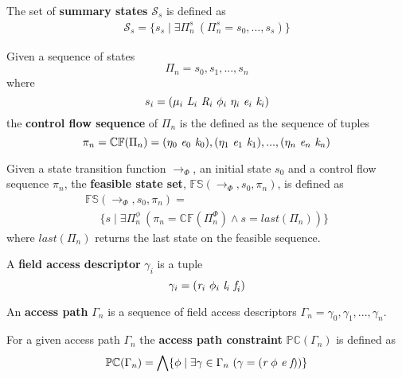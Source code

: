 \begin{definition}
The set of \textbf{summary states} $\mathcal{S}_s$ is defined as
\begin{align}
\mathcal{S}_s = \{s_s \mid \exists \Pi_n^s\ (\Pi_n^s = s_0, \ldots, s_s)\}
\end{align}
\end{definition}

\begin{definition}
Given a sequence of states $$\Pi_n = s_0,s_1,...,s_n$$ where $$s_i = ( \mu_i\ \cfgnt{L}_i\ \cfgnt{R}_i\ \phi_i\ \eta_i\ \cfgnt{e}_i\ \cfgnt{k}_i )$$ the \textbf{control flow sequence} of $\Pi_n$ is the defined as the sequence of tuples $$ \pi_n = \mathbb{CF}(\Pi_n) = (\eta_0\ \cfgnt{e}_0\ \cfgnt{k}_0),(\eta_1\ \cfgnt{e}_1\ \cfgnt{k}_1),...,(\eta_n\ \cfgnt{e}_n\ \cfgnt{k}_n)$$
\end{definition}

\begin{definition}
Given a state transition function $\rightarrow_{\Phi}$, an initial state $s_0$ and a control flow sequence $\pi_n$, the \textbf{feasible state set}, $\mathbb{FS}(\rightarrow_{\Phi},s_0,\pi_n)$, is defined as
 $$
\begin{array}{l}
\mathbb{FS}(\rightarrow_{\Phi},s_0,\pi_n) = \\
\ \ \ \ \ \ \{s \mid \exists \Pi_n^\phi\ (\pi_n = \mathbb{CF}(\Pi_n^\Phi) \wedge s = \mathit{last}(\Pi_n))\} 
\end{array}
$$
where $\mathit{last}(\Pi_n)$ returns the last state on the feasible sequence.
\end{definition}

\begin{definition}
A \textbf{field access descriptor} $\gamma_i$ is a tuple 
$$ \gamma_i = (\cfgnt{r}_i\ \phi_i\ \cfgnt{l}_i\ \cfgnt{f}_i)$$
\end{definition}

\begin{definition}
An \textbf{access path} $\Gamma_n$ is a sequence of field access descriptors
$ \Gamma_n = \gamma_0,\gamma_1,...,\gamma_n $.
\end{definition}

\begin{definition}
For a given access path $\Gamma_n$ the \textbf{access path constraint} $\mathbb{PC}(\Gamma_n)$ is defined as
$$\mathbb{PC}(\Gamma_n) =  \bigwedge \{\phi \mid \exists \gamma \in \Gamma_n \ (\gamma = (\emph{r}\ \phi\ \emph{e}\ \emph{f}))\}$$  
\end{definition}

